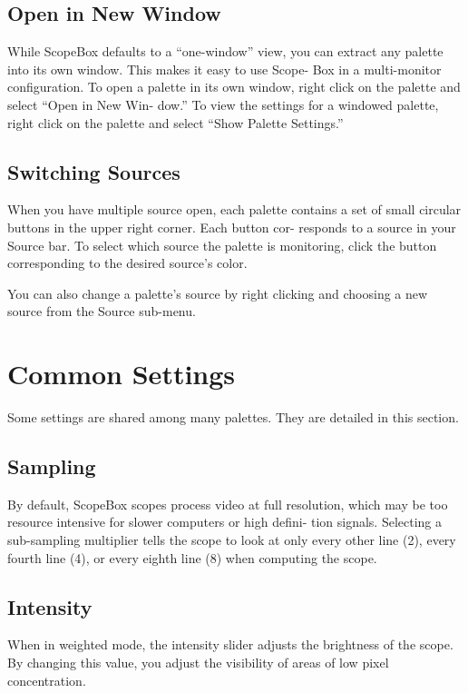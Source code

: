 \documentclass[10,letterpaper,]{report}
\begin{document}
\subsection{Open in New Window}

While ScopeBox defaults to a ``one-window'' view, you can extract any
palette into its own window. This makes it easy to use Scope- Box in a
multi-monitor configuration. To open a palette in its own window, right
click on the palette and select ``Open in New Win- dow.'' To view the
settings for a windowed palette, right click on the palette and select
``Show Palette Settings.''

\subsection{Switching Sources}

When you have multiple source open, each palette contains a set of small
circular buttons in the upper right corner. Each button cor- responds to
a source in your Source bar. To select which source the palette is
monitoring, click the button corresponding to the desired source's
color.

You can also change a palette's source by right clicking and choosing a
new source from the Source sub-menu.

\section{Common Settings}

Some settings are shared among many palettes. They are detailed in this
section.

\subsection{Sampling}

By default, ScopeBox scopes process video at full resolution, which may
be too resource intensive for slower computers or high defini- tion
signals. Selecting a sub-sampling multiplier tells the scope to look at
only every other line (2), every fourth line (4), or every eighth line
(8) when computing the scope.

\subsection{Intensity}

When in weighted mode, the intensity slider adjusts the brightness of
the scope. By changing this value, you adjust the visibility of areas of
low pixel concentration.
\end{document}
